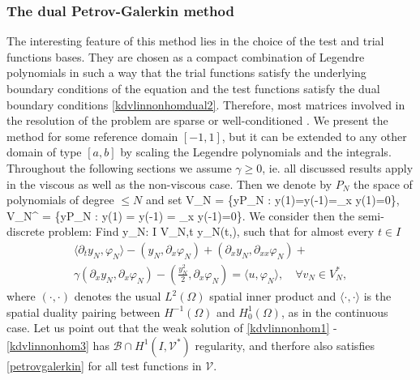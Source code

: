 \subsubsection{The dual Petrov-Galerkin method}
The interesting feature of this method lies in the choice of the test and trial functions bases. They are chosen as a compact combination of Legendre polynomials in such a way that the trial functions satisfy the underlying boundary conditions of the equation and the test functions satisfy the dual boundary conditions \eqref{kdvlinnonhomdual2}. Therefore, most matrices involved in the resolution of the problem are sparse or well-conditioned \cite{shen2003new}. We present the method for some reference domain $[-1,1]$, but it can be extended to any other domain of type $[a,b]$ by scaling the Legendre polynomials and the integrals. {\color{red} Throughout the following sections we assume $\gamma\geq0$, ie. all discussed results apply in the viscous as well as the non-viscous case.} Then we denote by $P_N$ the space of polynomials of degree $\leq N$ and set
\be
V_N = \left\{y\in P_N : y(1)=y(-1)=\partial_x y(1)=0\right\},
\ee
\be
V_N^{\ast} = \left\{y\in P_N : y(1) = y(-1) = \partial_x y(-1)=0\right\}.
\ee
We consider then the semi-discrete problem: Find
\be\nonumber
y_N: \quad I \rightarrow V_N,\quad t \mapsto y_N(t,\cdot),
\ee
such that for almost every $t\in I$
\begin{multline}
\langle\partial_t y_N , \varphi_N\rangle - \left( y_N, \partial_x \varphi_N \right) + \left(\partial_x y_N, \partial_{xx}\varphi_N \right)  + \\ \gamma \left( \partial_x y_N, \partial_x \varphi_N \right)- \left(\frac{y_N^2}{2}, \partial_x \varphi_N\right)= \langle u, \varphi_N\rangle, \quad \forall v_N \in V_N^{\ast},
\label{petrovgalerkin}
\end{multline}
where $\left( \cdot, \cdot \right)$ denotes the usual $L^2(\Omega)$ spatial inner product and $\langle \cdot, \cdot \rangle$ is the spatial duality pairing between $H^{-1}(\Omega)$ and $H^1_0(\Omega)$, as in the continuous case. Let us point out that the weak solution of \eqref{kdvlinnonhom1} - \eqref{kdvlinnonhom3} has $\mathcal{B}\cap H^1(I,\mathcal{V}^*)$ regularity, and therfore also satisfies \eqref{petrovgalerkin} for all test functions in $\mathcal{V}$.


